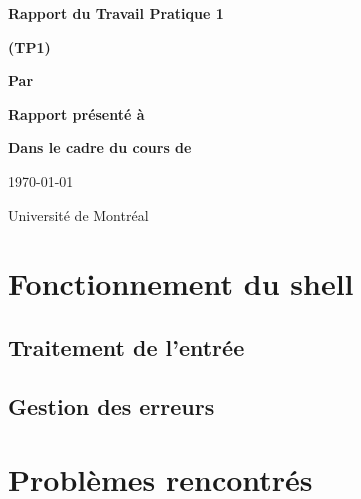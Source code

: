 \documentclass[letterpaper,12pt]{scrartcl}
\begin{document}
	\begin{center}
		\vspace{2cm}

		{\Huge\bf\sf Rapport du Travail Pratique 1}

		\vspace{0.5cm}

		{\bf\sf (TP1)}

		\vspace{4cm}

		{\bf\sf Par}

		\vspace{0.5cm}{\large\bf\sf Charles Langlois et François Poitras}

		\vspace{2cm}

		{\bf\sf Rapport présenté à}

		\vspace{0.5cm}{\large\bf\sf M. Stefan Monnier}

		\vspace{2cm}

		{\bf\sf Dans le cadre du cours de}

		\vspace{0.5cm}{\large\bf\sf Systèmes d'exploitation (IFT2245)}

		\vspace{\fill}
		\today

		\vspace{0.5cm}Université de Montréal
	\end{center}
	
	\newpage

	\pagestyle{cb}
	
	\tableofcontents

	\newpage

	\section{Fonctionnement du shell}
		\subsection{Traitement de l'entrée}
		\subsection{Gestion des erreurs}
	\section{Problèmes rencontrés}
\end{document}
